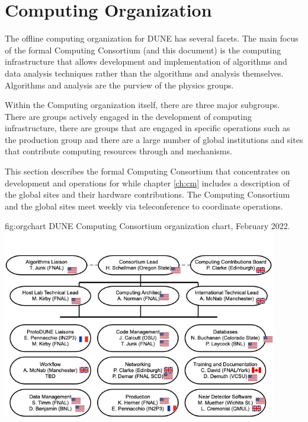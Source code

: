 \documentclass[../main-v1.tex]{subfiles}
\begin{document}
\chapter{Computing Organization}\label{ch:org}

The offline computing organization for DUNE has several facets. The main focus of the formal Computing Consortium (and this document) is the computing infrastructure that allows development and implementation of algorithms and data analysis techniques rather than the algorithms and analysis themselves. Algorithms and analysis are the purview of the physics groups.

Within the Computing organization itself, there are three major subgroups.  There are groups actively engaged in the development of  computing infrastructure, there are groups that are engaged in  specific operations such as the production group and there are a large number of global institutions and sites that contribute computing resources through  and  mechanisms.  

This section describes the formal Computing Consortium that concentrates on development and operations for  while chapter \ref{ch:cm} includes a description of the global sites and their hardware contributions. The Computing Consortium and the global sites meet weekly via teleconference to coordinate operations. 

\begin{dunefigure}
{fig:orgchart}
{DUNE Computing Consortium organization chart, February 2022.}
{\includegraphics[width=0.9\textwidth]{graphics/IntroFigures/MTOrgChartFeb22.png}}
\end{dunefigure}
\end{document}
